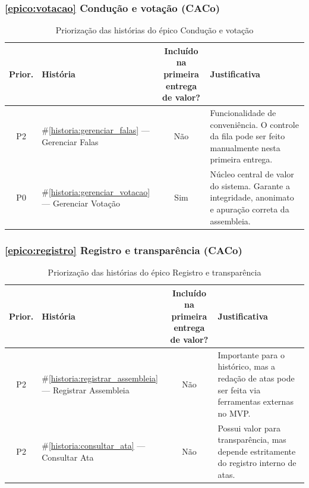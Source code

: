 \documentclass[12pt,a4paper]{article}
\newcounter{epico}
\newcounter{historia}
\begin{document}
\subsubsection{\ref{epico:votacao} Condução e votação (CACo)}

\begin{table}[H]
\centering
\small
\begin{tabular}{|c|m{3.4cm}|c|m{6.7cm}|}
\hline
\rowcolor[gray]{0.9}
\textbf{Prior.} &
\textbf{História} &
\makecell{\textbf{Incluído na primeira}\\
\textbf{entrega de valor?}} &
\textbf{Justificativa} \\
\hline

P2 &
\#\ref{historia:gerenciar_falas} --- Gerenciar Falas &
Não &
Funcionalidade de conveniência. O controle da fila pode ser feito manualmente nesta primeira entrega. \\

\hline
P0 &
\#\ref{historia:gerenciar_votacao} --- Gerenciar Votação &
Sim &
Núcleo central de valor do sistema. Garante a integridade, anonimato e apuração correta da assembleia. \\

\hline

\end{tabular}
\caption{Priorização das histórias do épico Condução e votação}
\end{table}

\subsubsection{\ref{epico:registro} Registro e transparência (CACo)}

\begin{table}[H]
\centering
\small
\begin{tabular}{|c|m{3.4cm}|c|m{6.7cm}|}
\hline
\rowcolor[gray]{0.9}
\textbf{Prior.} &
\textbf{História} &
\makecell{\textbf{Incluído na primeira}\\
\textbf{entrega de valor?}} &
\textbf{Justificativa} \\
\hline

P2 &
\#\ref{historia:registrar_assembleia} --- Registrar Assembleia &
Não &
Importante para o histórico, mas a redação de atas pode ser feita via ferramentas externas no MVP. \\

\hline
P2 &
\#\ref{historia:consultar_ata} --- Consultar Ata &
Não &
Possui valor para transparência, mas depende estritamente do registro interno de atas. \\

\hline

\end{tabular}
\caption{Priorização das histórias do épico Registro e transparência}
\end{table}
\end{document}

